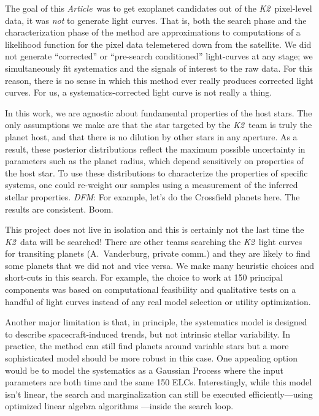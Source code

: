 \documentclass[12pt,preprint]{aastex}
\newcommand{\project}[1]{\textsl{#1}} %
\newcommand{\KT}{\project{K2}}
\newcommand{\paper}{\textsl{Article}}
\newcommand{\todo}[3]{{\color{#2}\emph{#1}: #3}}
\newcommand{\dfmtodo}[1]{\todo{DFM}{red}{#1}}
\begin{document}
The goal of this \paper\ was to get exoplanet candidates out of the
\KT\ pixel-level data, it was \emph{not} to generate light curves.
That is, both the search phase and the characterization phase of the method
are approximations to computations of a likelihood function for the pixel
data telemetered down from the satellite.
We did not generate ``corrected'' or ``pre-search conditioned'' light-curves
at any stage; we simultaneously fit systematics and the signals of interest
to the raw data.
For this reason, there is no sense in which this method ever really
produces corrected light curves.
For us, a systematics-corrected light curve is not really a thing.

In this work, we are agnostic about fundamental properties of the host stars.
The only assumptions we make are that the star targeted by the \KT\
team is truly the planet host, and that there is no dilution by other stars in
any aperture.
As a result, these posterior distributions reflect the maximum possible
uncertainty in parameters such as the planet radius, which depend sensitively
on properties of the host star.
To use these distributions to characterize the properties of specific systems,
one could re-weight our samples using a measurement of the inferred stellar
properties.
\dfmtodo{For example, let's do the Crossfield planets here. The results are
consistent. Boom.}

This project does not live in isolation and this is certainly not the last
time the \KT\ data will be searched!
There are other teams searching the \KT\ light curves for transiting planets
(A.~Vanderburg, private comm.) and they are likely to find some planets that
we did not and vice versa.
We make many heuristic choices and short-cuts in this search.
For example, the choice to work at 150 principal components was based on
computational feasibility and qualitative tests on a handful of light curves
instead of any real model selection or utility optimization.

Another major limitation is that, in principle, the systematics model is
designed to describe spacecraft-induced trends, but not intrinsic stellar
variability.
In practice, the method can still find planets around variable stars but a
more sophisticated model should be more robust in this case.
One appealing option would be to model the systematics as a Gaussian Process
where the input parameters are both time and the same 150 ELCs.
Interestingly, while this model isn't linear, the search and marginalization
can still be executed efficiently---using optimized linear algebra algorithms
\citep[][Foreman-Mackey et al.\ in preparation]{fastgp}---inside the search
loop.
\end{document}

